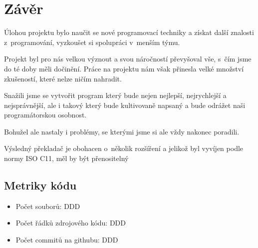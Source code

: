 \section{Závěr}
Úlohou projektu bylo naučit se nové programovací techniky
a získat další znalosti z~programování,
vyzkoušet si spolupráci v~menším týmu.

Projekt byl pro nás velkou význout a svou náročností převyšoval vše, s~čím jsme do té doby měli dočinění.
Práce na projektu nám však přinesla velké množství zkušeností, které nelze ničím nahradit.

Snažili jsme se vytvořit program který bude nejen nejlepší,
nejrychlejší a nejsprávnější, ale i takový který bude kultivovaně
napsaný a bude odrážet naši programátorskou osobnost.

Bohužel ale nastaly i problémy, se kterými jsme si ale vždy
nakonec poradili.

Výsledný překladač je obohacen o~několik rozšíření a jelikož
byl vyvíjen podle normy ISO C11, měl by být přenositelný

\subsection{Metriky kódu}
\begin{itemize}
    \item Počet souborů: DDD
    \item Počet řádků zdrojového kódu: DDD
    \item Počet commitů na githubu: DDD
\end{itemize}